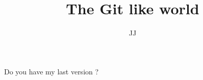 \documentclass[12pt]{beamer}
\title{The Git like world}
\author{JJ}
\begin{document}
\begin{frame}
	\titlepage
\end{frame}
%
\begin{frame}{Do you have my last version ?}
	
\end{frame}

	
\end{document}
